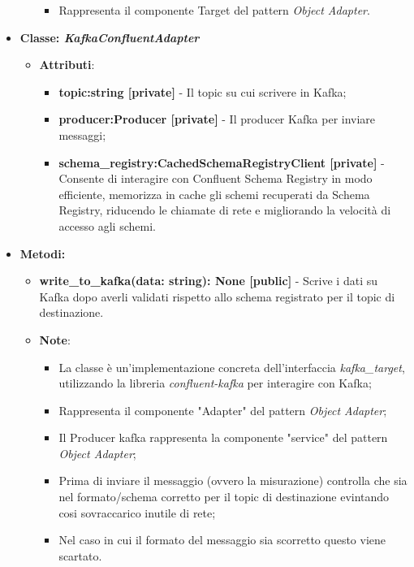 \begin{itemize}
\begin{itemize}
\begin{itemize}
            \item Rappresenta il componente Target del pattern \textit{Object Adapter}.
        \end{itemize}
    \end{itemize}
    \item{\textbf{Classe: \textit{KafkaConfluentAdapter}}}
    \begin{itemize}
        \item\textbf{Attributi}:
        \begin{itemize}
            \item \textbf{topic:string [private]} - Il topic su cui scrivere in Kafka;
            \item \textbf{producer:Producer [private]} - Il producer Kafka per inviare messaggi;
            \item \textbf{schema\_registry:CachedSchemaRegistryClient [private]} - Consente di interagire con Confluent Schema Registry in modo efficiente, memorizza in cache gli schemi recuperati da Schema Registry, riducendo le chiamate di rete e migliorando la velocità di accesso agli schemi.
        \end{itemize}
    \end{itemize}
    \item \textbf{Metodi: }
    \begin{itemize}
        \item \textbf{write\_to\_kafka(data: string): None [public]} - Scrive i dati su Kafka dopo averli validati rispetto allo schema registrato per il topic di destinazione.
    \item\textbf{Note}:
        \begin{itemize}
            \item La classe è un'implementazione concreta dell'interfaccia \textit{kafka\_target}, utilizzando la libreria \textit{confluent-kafka} per interagire con Kafka;
            \item Rappresenta il componente "Adapter" del pattern \textit{Object Adapter};
            \item Il Producer kafka rappresenta la componente "service" del pattern \textit{Object Adapter};
            \item Prima di inviare il messaggio (ovvero la misurazione) controlla che sia nel formato/schema corretto per il topic di destinazione evintando cosi sovraccarico inutile di rete;
            \item Nel caso in cui il formato del messaggio sia scorretto questo viene scartato.
        \end{itemize}
    \end{itemize}
\end{itemize}

